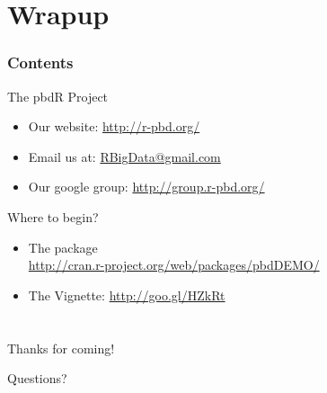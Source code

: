 \section{Wrapup}

\hidenum
\begin{frame}[noframenumbering]
\frametitle{Contents}
 \tableofcontents[currentsection,hideothersubsections,sectionstyle=show/hide]
\end{frame}
\shownum

\begin{frame}
  \begin{block}{The pbdR Project}
    \begin{itemize}
      \item Our website: \url{http://r-pbd.org/}
      \item Email us at: \url{RBigData@gmail.com}
      \item Our google group: \url{http://group.r-pbd.org/}
     \end{itemize}
\end{block}
  \begin{block}{Where to begin?}
    \begin{itemize}
      \item The  package\\
      \url{http://cran.r-project.org/web/packages/pbdDEMO/}\\
      \item The  Vignette: \url{http://goo.gl/HZkRt}
    \end{itemize}
\end{block}
\end{frame}


\section*{}



\hidenum
\begin{frame}[noframenumbering]
 \begin{block}{Thanks for coming!}
 \begin{center}
     {\Large Questions?}\\[.6cm]
  \end{center}
 \end{block}
\end{frame}
